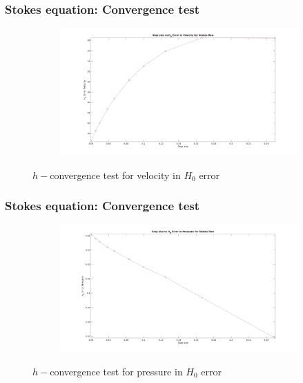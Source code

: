 \documentclass{beamer}
\begin{document}
\begin{frame}
\frametitle{Stokes equation: Convergence test}
\begin{figure}
\begin{subfigure}{\textwidth}	
  \includegraphics[width=\linewidth]{h0_velocity_stokes.jpg}
  \label{fig:vel_stoke_conv_h0}
\end{subfigure}
\caption{$h-$convergence test for velocity in $H_0$ error }
\end{figure}
\end{frame}
\begin{frame}
\frametitle{Stokes equation: Convergence test}
\begin{figure}
\begin{subfigure}{\textwidth}	
  \includegraphics[width=\linewidth]{h0_pressure_stokes.jpg}
  \label{fig:pre_stoke_conv_h0}
\end{subfigure}
\caption{$h-$convergence test for pressure in $H_0$ error}
\end{figure}
\end{frame}
\end{document}
